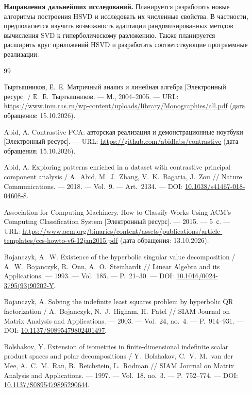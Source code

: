 \documentclass[a4paper,12pt]{article}
\theoremstyle{csstyle}
\begin{document}
\textbf{Направления дальнейших исследований.}
Планируется разработать новые алгоритмы построения HSVD
и исследовать их численные свойства.
В частности, предполагается изучить возможность адаптации
рандомизированных методов вычисления SVD к гиперболическому разложению.
Также планируется расширить круг приложений HSVD
и разработать соответствующие программные реализации.

{}

\begin{thebibliography}{99}
\raggedright
{}
Тыртышников, Е.~Е.
Матричный анализ и линейная алгебра [Электронный ресурс] /
Е.~Е.~Тыртышников. --- М., 2004--2005. ---
URL: \url{https://www.inm.ras.ru/wp-content/uploads/library/Monographies/all.pdf}
(дата обращения: 15.10.2026).

Abid, A.
Contrastive PCA: авторская реализация и демонстрационные ноутбуки
[Электронный ресурс]. ---
URL: \url{https://github.com/abidlabs/contrastive}
(дата обращения: 15.10.2026).

Abid, A.
Exploring patterns enriched in a dataset with contrastive principal component
analysis / A.~Abid, M.~J.~Zhang, V.~K.~Bagaria, J.~Zou //
Nature Communications. --- 2018. --- Vol.~9. --- Art.~2134. ---
DOI: \href{https://doi.org/10.1038/s41467-018-04608-8}{10.1038/s41467-018-04608-8}.

Association for Computing Machinery.
How to Classify Works Using ACM's Computing Classification System
[Электронный ресурс]. --- 2015. --- 5~с. ---
URL: \url{https://www.acm.org/binaries/content/assets/publications/article-templates/ccs-howto-v6-12jan2015.pdf}
(дата обращения: 13.10.2026).

Bojanczyk, A.~W.
Existence of the hyperbolic singular value decomposition /
A.~W.~Bojanczyk, R.~Onn, A.~O.~Steinhardt //
Linear Algebra and its Applications. --- 1993. ---
Vol.~185. --- P.~21--30. ---
DOI: \href{https://doi.org/10.1016/0024-3795(93)90202-Y}{10.1016/0024-3795(93)90202-Y}.

Bojanczyk, A.
Solving the indefinite least squares problem by hyperbolic QR factorization /
A.~Bojanczyk, N.~J.~Higham, H.~Patel //
SIAM Journal on Matrix Analysis and Applications. --- 2003. ---
Vol.~24, no.~4. --- P.~914--931. ---
DOI: \href{https://doi.org/10.1137/S0895479802401497}{10.1137/S0895479802401497}.

Bolshakov, Y.
Extension of isometries in finite-dimensional indefinite scalar product
spaces and polar decompositions /
Y.~Bolshakov, C.~V.~M.~van der Mee, A.~C.~M.~Ran,
B.~Reichstein, L.~Rodman //
SIAM Journal on Matrix Analysis and Applications. --- 1997. ---
Vol.~18, no.~3. --- P.~752--774. ---
DOI: \href{https://doi.org/10.1137/S0895479895290644}{10.1137/S0895479895290644}.


\end{thebibliography}
\end{document}
